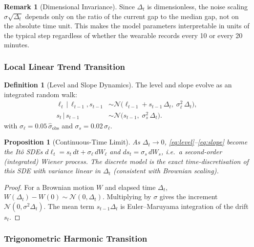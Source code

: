 \documentclass[11pt, a4paper]{article}
\theoremstyle{plain}
\newtheorem{proposition}[theorem]{Proposition}
\theoremstyle{definition}
\newtheorem{definition}[theorem]{Definition}
\newtheorem{remark}[theorem]{Remark}
\newcommand{\N}{\mathcal{N}}
\newcommand{\given}{\,|\,}
\begin{document}
\begin{remark}[Dimensional Invariance]
Since $\Delta_t$ is dimensionless, the noise scaling $\sigma \sqrt{\Delta_t}$
depends only on the ratio of the current gap to the median gap, not on the
absolute time unit. This makes the model parameters interpretable in units
of the typical step regardless of whether the wearable records every 10 or
every 20 minutes.
\end{remark}

\subsubsection{Local Linear Trend Transition}

\begin{definition}[Level and Slope Dynamics]
The level and slope evolve as an integrated random walk:
\begin{align}
  \ell_t \given \ell_{t-1}, s_{t-1}
    &\sim \N\!\bigl(\ell_{t-1} + s_{t-1}\,\Delta_t,\;\sigma_\ell^2\,\Delta_t\bigr),
    \label{eq:level}\\
  s_t \given s_{t-1}
    &\sim \N\!\bigl(s_{t-1},\;\sigma_s^2\,\Delta_t\bigr).
    \label{eq:slope}
\end{align}
with $\sigma_\ell = 0.05\,\hat\sigma_{\mathrm{obs}}$ and $\sigma_s = 0.02\,\sigma_\ell$.
\end{definition}

\begin{proposition}[Continuous-Time Limit]
As $\Delta_t \to 0$, \eqref{eq:level}--\eqref{eq:slope} become the
It\^{o} SDEs
$d\ell_t = s_t\,dt + \sigma_\ell\,dW_\ell$ and $ds_t = \sigma_s\,dW_s$,
i.e.\ a second-order (integrated) Wiener process. The discrete model is
the \emph{exact} time-discretisation of this SDE with variance linear in
$\Delta_t$ (consistent with Brownian scaling).
\end{proposition}
\begin{proof}
For a Brownian motion $W$ and elapsed time $\Delta_t$,
$W(\Delta_t) - W(0) \sim \N(0, \Delta_t)$. Multiplying by $\sigma$ gives
the increment $\N(0, \sigma^2 \Delta_t)$. The mean term $s_{t-1}\Delta_t$
is Euler--Maruyama integration of the drift $s_t$.
\end{proof}

\subsubsection{Trigonometric Harmonic Transition}
\end{document}
